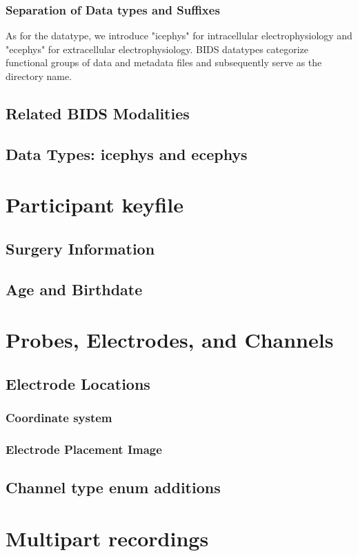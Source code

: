 \documentclass[fleqn,10pt]{wlscirep}
\begin{document}
\subsubsection*{Separation of Data types and Suffixes}
As for the datatype, we introduce "icephys" for intracellular electrophysiology and "ecephys" for extracellular electrophysiology. BIDS datatypes categorize functional groups of data and metadata files and subsequently serve as the directory name.

\subsection*{Related BIDS Modalities}


\subsection*{Data Types: icephys and ecephys}
\section*{Participant keyfile}
\subsection*{Surgery Information}
\subsection*{Age and Birthdate}
\section*{Probes, Electrodes, and Channels}
\subsection*{Electrode Locations}
\subsubsection*{Coordinate system}
\subsubsection*{Electrode Placement Image}
\subsection*{Channel type enum additions}
\section*{Multipart recordings}
\end{document}
